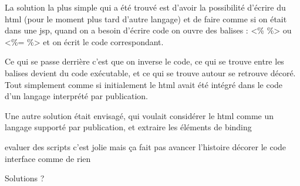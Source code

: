 
La solution la plus simple qui a été trouvé est d'avoir la possibilité d'écrire 
du html (pour le moment plus tard d'autre langage) et de faire comme si on était
dans une jsp, quand on a besoin d'écrire code on ouvre des balises : <\% \%>
ou <\%= \%> et on écrit le code correspondant.

Ce qui se passe derrière c'est que on inverse le code, ce qui se trouve entre
les balises devient du code exécutable, et ce qui se trouve autour se retrouve
décoré. Tout simplement comme si initialement le html avait été intégré dans
le code d'un langage interprété par publication.

Une autre solution était envisagé, qui voulait considérer le html comme un langage
supporté par publication, et extraire les éléments de binding 


evaluer des scripts c'est jolie mais ça fait pas avancer l'histoire
décorer le code interface comme de rien

Solutions ?
